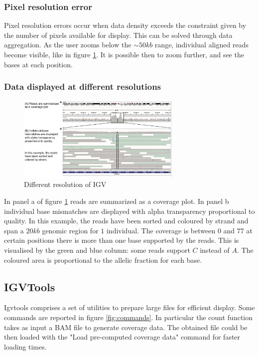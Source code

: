         \subsubsection{Pixel resolution error}
        Pixel resolution errors occur when data density exceeds the constraint given by the number of pixels available for display.
        This can be solved through data aggregation.
        As the user zooms below the $\sim 50 kb$ range, individual aligned reads become visible, like in figure \ref{fig:ViewReads}.
        It is possible then to zoom further, and see the bases at each position.

        \subsubsection{Data displayed at different resolutions}

        \begin{figure}[H]
            \centering
            \includegraphics[width=0.7\textwidth]{IGVReadsView.PNG}
            \caption{Different resolution of IGV}
            \label{fig:ViewReads}
        \end{figure}

        In panel a of figure \ref{fig:ViewReads} reads are summarized as a coverage plot.
        In panel b individual base mismatches are displayed with alpha transparency proportional to quality.
        In this example, the reads have been sorted and coloured by strand and span a $20 kb$ genomic region for $1$ individual.
        The coverage is between $0$ and $77$ at certain positions there is more than one base supported by the reads.
        This is visualised by the green and blue column: some reads support $C$ instead of $A$.
        The coloured area is proportional to the allelic fraction for each base.

    \subsection{IGVTools}
    Igvtools comprises a set of utilities to prepare large files for efficient display.
    Some commands are reported in figure \ref{fig:commands}.
    In particular the count function takes as input a BAM file to generate coverage data.
    The obtained file could be then loaded with the "Load pre-computed coverage data" command for faster loading times.

